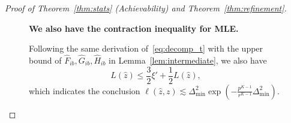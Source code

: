 \documentclass[journal]{IEEEtran}
\theoremstyle{definition}
\theoremstyle{definition}
\newcommand{\of}[1]{\left(#1\right)}
\newcounter{MYtempeqncnt}
\begin{document}
\begin{proof}[Proof of Theorem~\ref{thm:stats} (Achievability) and Theorem~\ref{thm:refinement}]
\begin{figure}[t]
     \textbf{We also have the contraction inequality for MLE.}
     
     Following the same derivation of~\eqref{eq:decomp_t} with the upper bound of $\hat F_{ib}, \hat G_{ib}, \hat H_{ib}$ in Lemma~\ref{lem:intermediate}, we also have
    \begin{equation}\label{eq:decomp_t_mle}
          L(\hat z) \leq \frac{3}{2} \xi'  + \frac{1}{2} L(\hat z),
    \end{equation}
    which indicates the conclusion $\ell(\hat z,z) \lesssim \Delta_{\min}^2  \exp \of{ - \frac{p^{K-1}}{r^{K-1}} \Delta_{\min}^2  }$.
\setcounter{equation}{\value{MYtempeqncnt}} 

\hrulefill 
\vspace*{4pt} 
\end{figure}
\setcounter{equation}{78} 
    

\end{proof}
\end{document}
